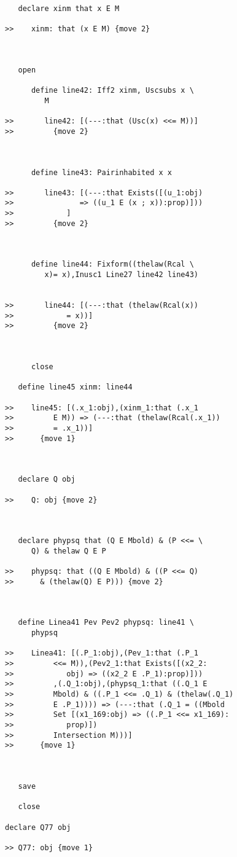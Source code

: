 \documentclass[12pt]{article}
\begin{document}
\begin{verbatim}
   declare xinm that x E M

>>    xinm: that (x E M) {move 2}



   open

      define line42: Iff2 xinm, Uscsubs x \
         M

>>       line42: [(---:that (Usc(x) <<= M))]
>>         {move 2}



      define line43: Pairinhabited x x

>>       line43: [(---:that Exists([(u_1:obj)
>>               => ((u_1 E (x ; x)):prop)]))
>>            ]
>>         {move 2}



      define line44: Fixform((thelaw(Rcal \
         x)= x),Inusc1 Line27 line42 line43)


>>       line44: [(---:that (thelaw(Rcal(x))
>>            = x))]
>>         {move 2}



      close

   define line45 xinm: line44

>>    line45: [(.x_1:obj),(xinm_1:that (.x_1
>>         E M)) => (---:that (thelaw(Rcal(.x_1))
>>         = .x_1))]
>>      {move 1}



   declare Q obj

>>    Q: obj {move 2}



   declare phypsq that (Q E Mbold) & (P <<= \
      Q) & thelaw Q E P

>>    phypsq: that ((Q E Mbold) & ((P <<= Q)
>>      & (thelaw(Q) E P))) {move 2}



   define Linea41 Pev Pev2 phypsq: line41 \
      phypsq

>>    Linea41: [(.P_1:obj),(Pev_1:that (.P_1
>>         <<= M)),(Pev2_1:that Exists([(x2_2:
>>            obj) => ((x2_2 E .P_1):prop)]))
>>         ,(.Q_1:obj),(phypsq_1:that ((.Q_1 E
>>         Mbold) & ((.P_1 <<= .Q_1) & (thelaw(.Q_1)
>>         E .P_1)))) => (---:that (.Q_1 = ((Mbold
>>         Set [(x1_169:obj) => ((.P_1 <<= x1_169):
>>            prop)])
>>         Intersection M)))]
>>      {move 1}



   save

   close

declare Q77 obj

>> Q77: obj {move 1}




\end{verbatim}
\end{document}
